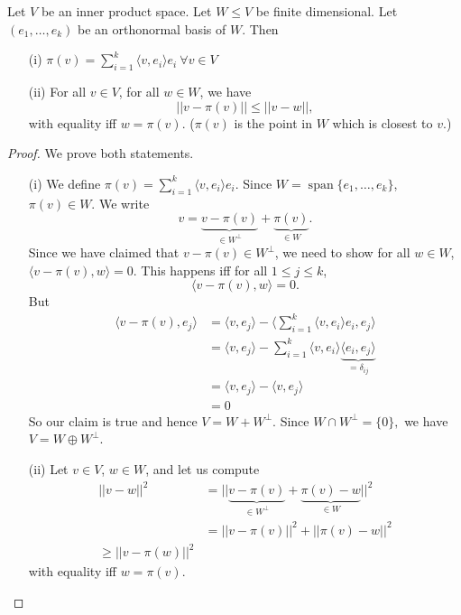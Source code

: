 \documentclass[egregdoesnotlikesansseriftitles,a4paper]{scrartcl}
\begin{document}
\begin{lemma}
      Let $V$ be an inner product space. Let $W \leq V$ be finite dimensional. Let $(e_1, \ldots ,e_k)$ be an orthonormal basis of $W$. Then 
      \begin{itemize}
           \item[(i)] $\pi (v)=\sum_{i=1}^{k}\langle v,e_i\rangle  e_i  \ \forall v \in V $
           \item[(ii)] For all $v \in V$, for all $w \in W$, we have 
           \[||v-\pi (v)||\leq ||v-w||,\]
           with equality iff $w=\pi (v)$. ($\pi (v)$ is the point in $W$ which is closest to $v$.)
      \end{itemize}
\end{lemma}
\begin{proof}
     We prove both statements.
      \begin{itemize}
           \item[(i)]We define $\pi (v)= \sum_{i=1}^{k}\langle v,e_i \rangle e_i$. Since $W=\operatorname{span}\{e_1,\ldots ,e_k\}$, $\pi (v) \in W$. We write 
           \[v=\underbrace{v-\pi (v)}_{\in W^\perp}+\underbrace{\pi (v)}_{\in W}.\]
           Since we have claimed that $v-\pi (v) \in W^\perp$, we need to show for all $w \in W$, $\langle v-\pi (v), w \rangle =0$. This happens iff for all $1 \leq j \leq k$, 
           \[\langle v-\pi (v),w \rangle=0 .\]
           But 
           \begin{align*}
                \langle v-\pi (v), e_j \rangle &=\langle v,e_j \rangle -\langle \sum_{i=1}^{k}\langle v,e_i \rangle e_i,e_j \rangle\\&=\langle v,e_j \rangle - \sum_{i=1}^{k}\langle v,e_i \rangle \underbrace{\langle e_i,e_j \rangle }_{=\delta_{ij}}\\&=\langle v,e_j \rangle -\langle v,e_j \rangle \\&=0
           \end{align*}
           So our claim is true and hence $V=W +W^\perp$. Since $W \cap W^\perp=\{0\},$ we have $V=W \oplus W^\perp$.
           \item[(ii)] Let $v \in V$, $w \in W$, and let us compute 
           \begin{align*}
                ||v-w||^2&=||\underbrace{v-\pi (v)}_{\in W^\perp}+\underbrace{\pi (v)-w}_{\in W}||^2\\
                &=||v-\pi (v)||^2+ ||\pi (v)-w||^2\\
                \geq ||v-\pi (w)||^2
           \end{align*}
          with equality iff $w=\pi (v)$.
      \end{itemize}
\end{proof}
\end{document}
